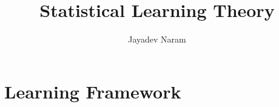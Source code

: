 \documentclass[11pt,a4paper]{article}
\author{Jayadev Naram}
\title{Statistical Learning Theory}
\begin{document}
\date{}
\maketitle
\tableofcontents
\newpage

\theoremstyle{plain}
\newtheorem{theorem}{Theorem}[section]
\newtheorem{corollary}{Corollary}[theorem]
\newtheorem{lemma}[theorem]{Lemma}
\newtheorem{proposition}[theorem]{Proposition}
\newtheorem{assume}{Assumption}

\theoremstyle{definition}
\newtheorem{definition}[theorem]{Definition}
\newtheorem{example}[theorem]{Example}
\newtheorem{remark}[theorem]{Remark}

\newcommand{\R}{\mathbb{R}}
\newcommand{\A}{\mathcal{A}}
\newcommand{\M}{\mathcal{M}}
\newcommand{\N}{\mathcal{N}}
\newcommand{\h}{\mathcal{H}}
\newcommand{\T}{\mathcal{T}}
\newcommand{\Prob}{\mathbb{P}}
\newcommand{\Dist}{\mathcal{D}}
\newcommand{\perpProj}{\mathcal{P}^\perp}
\newcommand{\bb}{\mathbb{B}}
\newcommand{\Sprod}{\mathbb{S}_{xy}}
\newcommand{\highlight}[1]{\textsl{\textbf{#1}}}
\newcommand{\mapping}[3]{#1:#2\rightarrow #3}
\newcommand{\doubt}{\highlight{[??]}}
\newcommand{\bigvert}[2]{\left.#1\right|_{#2}}
\newcommand{\sdnn}[1]{${#1}$}
\newcommand{\bsdnn}[1]{$\boldsymbol{#1}$}
\newcommand{\ifthen}[2]{\textbf{(#1)}\boldsymbol{\implies}\textbf{(#2)}}
\newcommand{\bsdn}[1]{\boldsymbol{#1}}
\newcommand{\forward}{$(\implies)$}
\newcommand{\converse}{$(\impliedby)$}
\newcommand{\Lt}[1]{\underset{#1\rightarrow 0}{Lt}}
\newcommand{\norm}[1]{\|#1\|}
\newcommand{\dparder}[2]{\dfrac{\partial #1}{\partial x_{#2}}}
\newcommand{\fparder}[2]{\frac{\partial #1}{\partial x_{#2}}}
\newcommand{\parder}[2]{\partial #1/\partial x_{#2}}
\newcommand{\parop}[1]{\dfrac{\partial}{\partial x_{#1}}}
\newcommand{\innerproduct}[2]{\langle #1, #2 \rangle}
\newcommand{\genst}{St_B(n,p)}
\newcommand{\igenst}[1]{St_{B_{#1}}(n_{#1},p)}
\newcommand{\realmat}[2]{\R^{#1\times #2}}
\newcommand{\Skew}{\mathcal{S}_{skew}(p)}
\newcommand{\Sym}{\mathcal{S}_{sym}(p)}
\newcommand{\XperpB}{X_{B^\perp}}
\newcommand{\polarRetr}{R^{polar}_X}
\newcommand{\qrRetr}{R^{QR}_X}
\newcommand{\vectransport}{\mathcal{T}}
\newcommand{\grad}{\text{grad}\,}
\newcommand{\hess}{\text{Hess}\,}

\section{Learning Framework}
\end{document}
